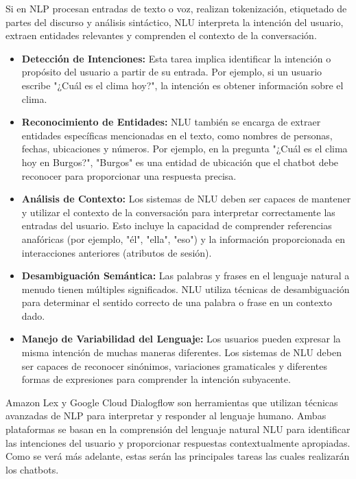 Si en NLP procesan entradas de texto o voz, realizan tokenización, etiquetado de partes del discurso y análisis sintáctico, NLU interpreta la intención del usuario, extraen entidades relevantes y comprenden el contexto de la conversación.

\begin{itemize}
\item \textbf{Detección de Intenciones:} Esta tarea implica identificar la intención o propósito del usuario a partir de su entrada. Por ejemplo, si un usuario escribe "¿Cuál es el clima hoy?", la intención es obtener información sobre el clima. 
\item \textbf{Reconocimiento de Entidades:} NLU también se encarga de extraer entidades específicas mencionadas en el texto, como nombres de personas, fechas, ubicaciones y números. Por ejemplo, en la pregunta "¿Cuál es el clima hoy en Burgos?", "Burgos" es una entidad de ubicación que el chatbot debe reconocer para proporcionar una respuesta precisa.
\item \textbf{Análisis de Contexto:} Los sistemas de NLU deben ser capaces de mantener y utilizar el contexto de la conversación para interpretar correctamente las entradas del usuario. Esto incluye la capacidad de comprender referencias anafóricas (por ejemplo, "él", "ella", "eso") y la información proporcionada en interacciones anteriores (atributos de sesión).
\item \textbf{Desambiguación Semántica:} Las palabras y frases en el lenguaje natural a menudo tienen múltiples significados. NLU utiliza técnicas de desambiguación para determinar el sentido correcto de una palabra o frase en un contexto dado.
\item \textbf{Manejo de Variabilidad del Lenguaje:} Los usuarios pueden expresar la misma intención de muchas maneras diferentes. Los sistemas de NLU deben ser capaces de reconocer sinónimos, variaciones gramaticales y diferentes formas de expresiones para comprender la intención subyacente.
\end{itemize}

Amazon Lex y Google Cloud Dialogflow son herramientas que utilizan técnicas avanzadas de NLP para interpretar y responder al lenguaje humano. Ambas plataformas se basan en la comprensión del lenguaje natural NLU para identificar las intenciones del usuario y proporcionar respuestas contextualmente apropiadas. Como se verá más adelante, estas serán las principales tareas las cuales realizarán los chatbots.


